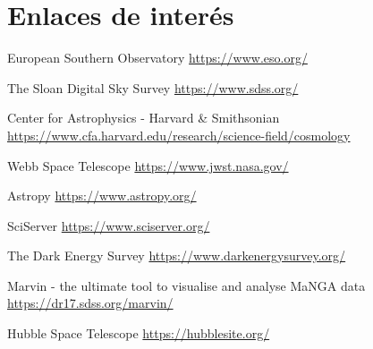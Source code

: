 
\section{Enlaces de inter\'es}



\begin{wwteorema}{European Southern Observatory}
\href{https://www.eso.org/}{https://www.eso.org/}
\end{wwteorema}

\begin{wwteorema}{The Sloan Digital Sky Survey}
\href{https://www.sdss.org/}{https://www.sdss.org/}	

\end{wwteorema}

\begin{wwteorema}{Center for Astrophysics - Harvard \& Smithsonian}
\href{https://www.cfa.harvard.edu/research/science-field/cosmology}{https://www.cfa.harvard.edu/research/science-field/cosmology}
\end{wwteorema}

\begin{wwteorema}{Webb Space Telescope}
\href{https://www.jwst.nasa.gov/}{https://www.jwst.nasa.gov/}
\end{wwteorema}

\begin{wwteorema}{Astropy}
\href{https://www.astropy.org/}{https://www.astropy.org/}
\end{wwteorema}

\begin{wwteorema}{SciServer}
\href{https://www.sciserver.org/}{https://www.sciserver.org/} \\
\citep{sciserver}
\end{wwteorema}

\begin{wwteorema}{The Dark Energy Survey}
\href{https://www.darkenergysurvey.org/}{https://www.darkenergysurvey.org/}
\end{wwteorema}


\begin{wwteorema}{Marvin - the ultimate tool to visualise and analyse MaNGA data}
\href{https://dr17.sdss.org/marvin/}{https://dr17.sdss.org/marvin/}
\end{wwteorema}

\begin{wwteorema}{Hubble Space Telescope}
\href{https://hubblesite.org/}{https://hubblesite.org/}
\end{wwteorema}

